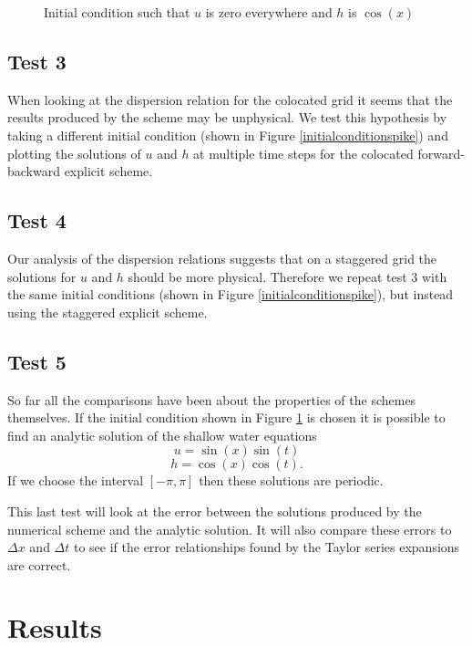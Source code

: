 \documentclass[a4paper,12pt, notitlepage]{report}
\begin{document}
\begin{figure}
\begin{minipage}{.5\textwidth}
		\caption{\label{initialconditioncos}Initial condition such that $u$ is zero everywhere and $h$ is $\cos(x)$}
	\end{minipage}
\end{figure}



\subsection*{Test 3}
When looking at the dispersion relation for the colocated grid it seems that the results produced by the scheme may be unphysical. We test this hypothesis by taking a different initial condition (shown in Figure \ref{initialconditionspike}) and plotting the solutions of $u$ and $h$ at multiple time steps for the colocated forward-backward explicit scheme.

\subsection*{Test 4}
Our analysis of the dispersion relations suggests that on a staggered grid the solutions for $u$ and $h$ should be more physical. Therefore we repeat test 3 with the same initial conditions (shown in Figure \ref{initialconditionspike}), but instead using the staggered explicit scheme.

\subsection*{Test 5}
So far all the comparisons have been about the properties of the schemes themselves. If the initial condition shown in Figure \ref{initialconditioncos} is chosen it is possible to find an analytic solution of the shallow water equations
\begin{equation}
u = \sin(x)\sin(t)
\end{equation}
\begin{equation}
h = \cos(x)\cos(t).
\end{equation}
If we choose the interval $[-\pi, \pi]$ then these solutions are periodic.

This last test will look at the error between the solutions produced by the numerical scheme and the analytic solution. It will also compare these errors to $\Delta x$ and $\Delta t$ to see if the error relationships found by the Taylor series expansions are correct.

\section*{Results}
\end{document}
